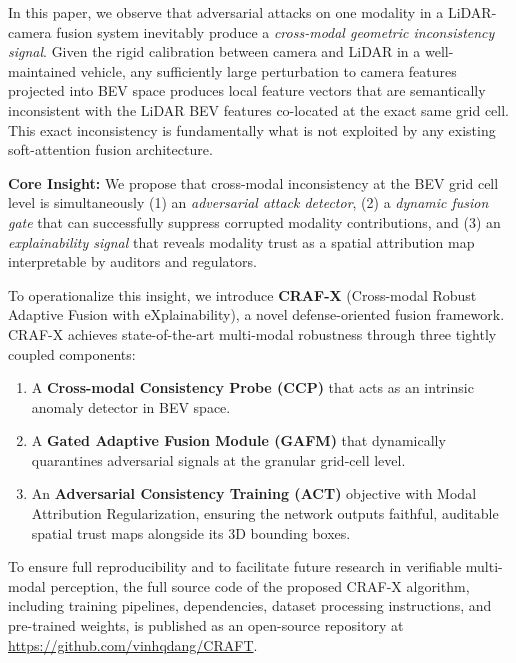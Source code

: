 In this paper, we observe that adversarial attacks on one modality in a LiDAR-camera fusion system inevitably produce a \textit{cross-modal geometric inconsistency signal}. Given the rigid calibration between camera and LiDAR in a well-maintained vehicle, any sufficiently large perturbation to camera features projected into BEV space produces local feature vectors that are semantically inconsistent with the LiDAR BEV features co-located at the exact same grid cell. This exact inconsistency is fundamentally what is not exploited by any existing soft-attention fusion architecture.

\textbf{Core Insight:} We propose that cross-modal inconsistency at the BEV grid cell level is simultaneously (1) an \textit{adversarial attack detector}, (2) a \textit{dynamic fusion gate} that can successfully suppress corrupted modality contributions, and (3) an \textit{explainability signal} that reveals modality trust as a spatial attribution map interpretable by auditors and regulators.

To operationalize this insight, we introduce \textbf{CRAF-X} (Cross-modal Robust Adaptive Fusion with eXplainability), a novel defense-oriented fusion framework. CRAF-X achieves state-of-the-art multi-modal robustness through three tightly coupled components:
\begin{enumerate}
    \item A \textbf{Cross-modal Consistency Probe (CCP)} that acts as an intrinsic anomaly detector in BEV space.
    \item A \textbf{Gated Adaptive Fusion Module (GAFM)} that dynamically quarantines adversarial signals at the granular grid-cell level.
    \item An \textbf{Adversarial Consistency Training (ACT)} objective with Modal Attribution Regularization, ensuring the network outputs faithful, auditable spatial trust maps alongside its 3D bounding boxes.
\end{enumerate}

To ensure full reproducibility and to facilitate future research in verifiable multi-modal perception, the full source code of the proposed CRAF-X algorithm, including training pipelines, dependencies, dataset processing instructions, and pre-trained weights, is published as an open-source repository at \url{https://github.com/vinhqdang/CRAFT}.

